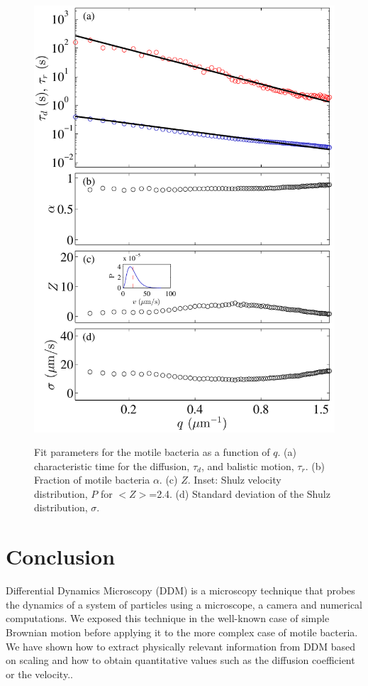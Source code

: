 \documentclass[%
 aip,
 jmp,%
 amsmath,amssymb,
reprint,%
]{revtex4-1}
\begin{document}
\begin{figure}
	\includegraphics[width=\linewidth]{VitesseDiffusionParams.pdf}\\
	\caption{Fit parameters for the motile bacteria as a function of $q$. (a) characteristic time for the diffusion, $\tau_d$, and balistic motion, $\tau_r$. (b) Fraction of motile bacteria $\alpha$. (c) $Z$. Inset: Shulz velocity distribution, $P$ for $<Z>$=2.4. (d) Standard deviation of the Shulz distribution, $\sigma$.}
	\label{FitParametersBacteria}
\end{figure}

\section{\label{cl}Conclusion}

Differential Dynamics Microscopy (DDM) is a microscopy technique that probes the dynamics of a system of particles using a microscope, a camera and numerical computations. We exposed this technique in the well-known case of simple Brownian motion before applying it to the more complex case of motile bacteria. We have shown how to extract physically relevant information from DDM based on scaling and how to obtain quantitative values such as the diffusion coefficient or the velocity..
\end{document}
